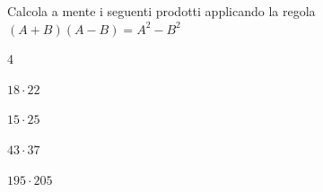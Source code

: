 
\begin{esercizio}
\label{ese:11.16}
Calcola a mente i seguenti prodotti applicando la regola 
\((A+B)(A-B)=A^2-B^2\)

\vspace{-.5em}
\begin{htmulticols}{4}
\begin{enumeratea}
\item \(18\cdot 22\)
\item \(15\cdot 25\)
\item \(43\cdot 37\)
\item \(195\cdot 205\)
\end{enumeratea}
\end{htmulticols}
\end{esercizio}

